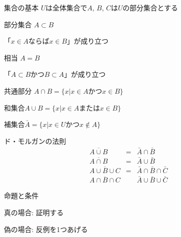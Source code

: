 \documentclass[aspectratio=169, 12pt]{beamer} %
\begin{document}
\begin{frame}{集合の基本}
    $U$は全体集合で$A$, $B$, $C$は$U$の部分集合とする \par
    部分集合 $A\subset B$ \par
    \begin{center}
        「$x \in A$ならば$x\in B$」が成り立つ\par
    \end{center}
    相当 $A=B$ \par
    \begin{center}
        「$A\subset B$かつ$B\subset A$」が成り立つ \par
    \end{center}

    共通部分 $A\cap B = \{x|x\in A かつ x \in B\}$ \par
    和集合\space\space\space\space $A\cup B = \{x|x\in A または x \in B \}$ \par
    補集合\space\space\space\space\space\space\space\space\space\space $\bar{A}=\{x|x\in U かつ x\notin A\}$
\end{frame}
\begin{frame}{ド・モルガンの法則}
    \begin{eqnarray*}
        \overline{A\cup B}&=&\bar{A}\cap \bar{B} \\
        \overline{A\cap B}&=&\bar{A}\cup \bar{B} \\
        \overline{A\cup B\cup C}&=&\bar{A}\cap\bar{B}\cap\bar{C} \\
        \overline{A\cap B\cap C}&&\bar{A}\cup\bar{B}\cup\bar{C}
    \end{eqnarray*}
\end{frame}
\begin{frame}{命題と条件}
    \begin{center}
        真の場合: 証明する \par
        偽の場合: 反例を1つあげる
    \end{center}
\end{frame}
\end{document}
